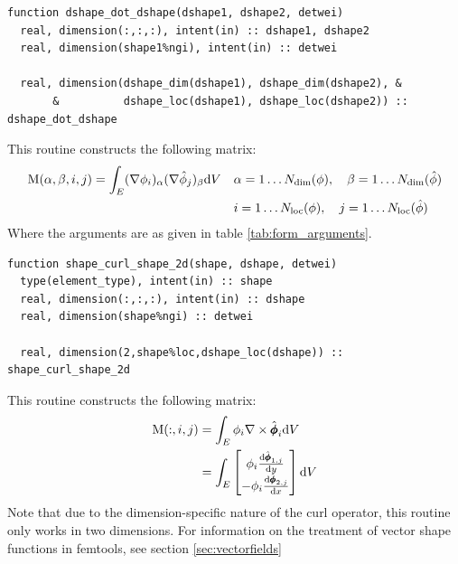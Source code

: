 \documentclass[a4paper, 11pt]{book}
\begin{document}

\begin{lstlisting}
function dshape_dot_dshape(dshape1, dshape2, detwei)
  real, dimension(:,:,:), intent(in) :: dshape1, dshape2
  real, dimension(shape1%ngi), intent(in) :: detwei

  real, dimension(dshape_dim(dshape1), dshape_dim(dshape2), &
       &          dshape_loc(dshape1), dshape_loc(dshape2)) :: dshape_dot_dshape
\end{lstlisting}

This routine constructs the following matrix:
\begin{equation}
  \begin{split}
  \mathrm{M}(\alpha,\beta,i,j)=\int_E (\nabla\phi_{i})_\alpha(\nabla\hat{\phi}_{j})_\beta\mathrm{d} V
  &\quad \alpha=1\ldots N_\mathrm{dim}(\phi),\quad \beta=1\ldots N_\mathrm{dim}(\hat{\phi})\\
  &\quad i=1\ldots N_\mathrm{loc}(\phi),\quad j=1\ldots N_\mathrm{loc}(\hat{\phi})
  \end{split}
\end{equation}
Where the arguments are as given in table \ref{tab:form_arguments}.


\begin{lstlisting}
function shape_curl_shape_2d(shape, dshape, detwei)
  type(element_type), intent(in) :: shape
  real, dimension(:,:,:), intent(in) :: dshape
  real, dimension(shape%ngi) :: detwei

  real, dimension(2,shape%loc,dshape_loc(dshape)) :: shape_curl_shape_2d
\end{lstlisting}

This routine constructs the following matrix:
\begin{equation}
  \begin{split}
    \mathrm{M}(:,i,j)&=\int_E \phi_i \nabla\times\hat{\pmb{\phi}}_i\mathrm{d} V\\
    &=\int_E
    \begin{bmatrix}
       \phi_i \frac{\mathrm{d}\hat{\pmb{\phi}}_{1,j}}{\mathrm{d} y}\\
      -\phi_i \frac{\mathrm{d}\hat{\pmb{\phi}}_{2,j}}{\mathrm{d} x}
    \end{bmatrix}\mathrm{d} V
  \end{split}
\end{equation}
Note that due to the dimension-specific nature of the curl operator, this
routine only works in two dimensions. For information on the treatment of
vector shape functions in femtools, see section \ref{sec:vectorfields}
\end{document}
